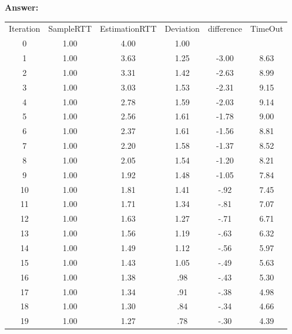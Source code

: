 \documentclass[a4paper]{article}
\begin{document}
\begin{itemize}
	      \textbf{Answer:}
	      \begin{tabular}{cccccc}
	      	Iteration & SampleRTT & EstimationRTT & Deviation & difference & TimeOut \\
	      	0         & 1.00      & 4.00          & 1.00      &            &         \\
	      	1         & 1.00      & 3.63          & 1.25      & -3.00      & 8.63    \\
	      	2         & 1.00      & 3.31          & 1.42      & -2.63      & 8.99    \\ 
	      	3         & 1.00      & 3.03          & 1.53      & -2.31      & 9.15    \\
	      	4         & 1.00      & 2.78          & 1.59      & -2.03      & 9.14    \\
	      	5         & 1.00      & 2.56          & 1.61      & -1.78      & 9.00    \\ 
	      	6         & 1.00      & 2.37          & 1.61      & -1.56      & 8.81    \\
	      	7         & 1.00      & 2.20          & 1.58      & -1.37      & 8.52    \\
	      	8         & 1.00      & 2.05          & 1.54      & -1.20      & 8.21    \\
	      	9         & 1.00      & 1.92          & 1.48      & -1.05      & 7.84    \\
	      	10        & 1.00      & 1.81          & 1.41      & -.92       & 7.45    \\
	      	11        & 1.00      & 1.71          & 1.34      & -.81       & 7.07    \\
	      	12        & 1.00      & 1.63          & 1.27      & -.71       & 6.71    \\
	      	13        & 1.00      & 1.56          & 1.19      & -.63       & 6.32    \\
	      	14        & 1.00      & 1.49          & 1.12      & -.56       & 5.97    \\
	      	15        & 1.00      & 1.43          & 1.05      & -.49       & 5.63    \\
	      	16        & 1.00      & 1.38          & .98       & -.43       & 5.30    \\
	      	17        & 1.00      & 1.34          & .91       & -.38       & 4.98    \\
	      	18        & 1.00      & 1.30          & .84       & -.34       & 4.66    \\
	      	19        & 1.00      & 1.27          & .78       & -.30       & 4.39    \\

\end{tabular}
\end{itemize}
\end{document}
